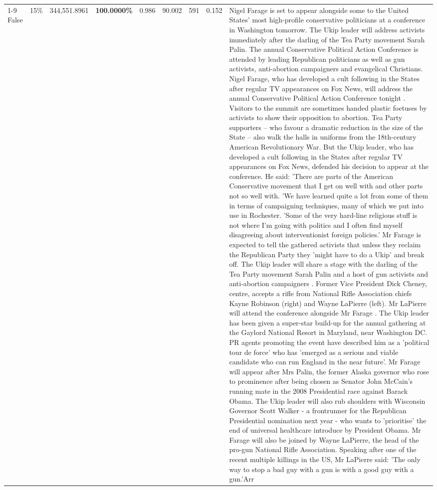 \begin{table}[H]
\begin{tabular}{lllrlllll}
\cline{1-9} \cline{2-9}
False & 15\% & 344,551.8961 & \bfseries \color{red} 100.0000\% & 0.986 & 90.002 & 591 & 0.152 & Nigel Farage is set to appear alongside some to the United States' most high-profile conservative politicians at a conference in Washington tomorrow. The Ukip leader will address activists immediately after the darling of the Tea Party movement Sarah Palin. The annual Conservative Political Action Conference is attended by leading Republican politicians as well as gun activists, anti-abortion campaigners and evangelical Christians. Nigel Farage, who has developed a cult following in the States after regular TV appearances on Fox News, will address the annual Conservative Political Action Conference tonight . Visitors to the summit are sometimes handed plastic foetuses by activists to show their opposition to abortion. Tea Party supporters – who favour a dramatic reduction in the size of the State – also walk the halls in uniforms from the 18th-century American Revolutionary War. But the Ukip leader, who has developed a cult following in the States after regular TV appearances on Fox News, defended his decision to appear at the conference. He said: 'There are parts of the American Conservative movement that I get on well with and other parts not so well with. 'We have learned quite a lot from some of them in terms of campaigning techniques, many of which we put into use in Rochester. 'Some of the very hard-line religious stuff is not where I'm going with politics and I often find myself disagreeing about interventionist foreign policies.' Mr Farage is expected to tell the gathered activists that unless they reclaim the Republican Party they 'might have to do a Ukip' and break off. The Ukip leader will share a stage with the darling of the Tea Party movement Sarah Palin and a host of gun activists and anti-abortion campaigners . Former Vice President Dick Cheney, centre, accepts a rifle from National Rifle Association chiefs Kayne Robinson (right) and Wayne LaPierre (left). Mr LaPierre will attend the conference alongside Mr Farage . The Ukip leader has been given a super-star build-up for the annual gathering at the Gaylord National Resort in Maryland, near Washington DC. PR agents promoting the event have described him as a 'political tour de force' who has 'emerged as a serious and viable candidate who can run England in the near future'. Mr Farage will appear after Mrs Palin, the former Alaska governor who rose to prominence after being chosen as Senator John McCain's running mate in the 2008 Presidential race against Barack Obama. The Ukip leader will also rub shoulders with Wisconsin Governor Scott Walker - a frontrunner for the Republican Presidential nomination next year - who wants to 'prioritise' the end of universal healthcare introduce by President Obama. Mr Farage will also be joined by Wayne LaPierre, the head of the pro-gun National Rifle Association. Speaking after one of the recent multiple killings in the US, Mr LaPierre said: 'The only way to stop a bad guy with a gun is with a good guy with a gun.'Arr \\

\end{tabular}
\end{table}
